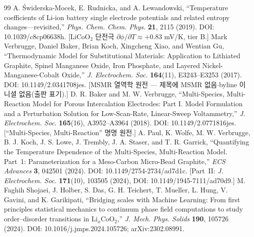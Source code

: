 \begin{thebibliography}{99}
 A. {\'S}widerska-Mocek, E. Rudnicka, and A. Lewandowski, ``Temperature coefficients of Li-ion battery single electrode potentials and related entropy changes---revisited,'' \emph{Phys. Chem. Chem. Phys.} \textbf{21}, 2115 (2019). DOI: 10.1039/c8cp06638h. [LiCoO$_2$ 단전극 $\partial\phi/\partial T\approx+0.83$ mV/K, tier B.]
 Mark Verbrugge, Daniel Baker, Brian Koch, Xingcheng Xiao, and Wentian Gu, ``Thermodynamic Model for Substitutional Materials: Application to Lithiated Graphite, Spinel Manganese Oxide, Iron Phosphate, and Layered Nickel-Manganese-Cobalt Oxide,'' \emph{J. Electrochem. Soc.} \textbf{164}(11), E3243--E3253 (2017). DOI: 10.1149/2.0341708jes. [MSMR 열역학 원전 --- 제목에 MSMR 없음$\cdot$byline 이니셜 없음(출판 표기).]
 D. R. Baker and M. W. Verbrugge, ``Multi-Species, Multi-Reaction Model for Porous Intercalation Electrodes: Part I. Model Formulation and a Perturbation Solution for Low-Scan-Rate, Linear-Sweep Voltammetry,'' \emph{J. Electrochem. Soc.} \textbf{165}(16), A3952--A3964 (2018). DOI: 10.1149/2.0771816jes. [``Multi-Species, Multi-Reaction'' 명명 원전.]
 A. Paul, K. Wolfe, M. W. Verbrugge, B. J. Koch, J. S. Lowe, J. Trembly, J. A. Staser, and T. R. Garrick, ``Quantifying the Temperature Dependence of the Multi-Species, Multi-Reaction Model. Part~1: Parameterization for a Meso-Carbon Micro-Bead Graphite,'' \emph{ECS Advances} \textbf{3}, 042501 (2024). DOI: 10.1149/2754-2734/ad7d1c. [Part~II: \emph{J. Electrochem. Soc.} \textbf{171}(10), 103505 (2024), DOI: 10.1149/1945-7111/ad70d9.]
 M. Faghih Shojaei, J. Holber, S. Das, G. H. Teichert, T. Mueller, L. Hung, V. Gavini, and K. Garikipati, ``Bridging scales with Machine Learning: From first principles statistical mechanics to continuum phase field computations to study order--disorder transitions in Li$_x$CoO$_2$,'' \emph{J. Mech. Phys. Solids} \textbf{190}, 105726 (2024). DOI: 10.1016/j.jmps.2024.105726; arXiv:2302.08991.
\end{thebibliography}
